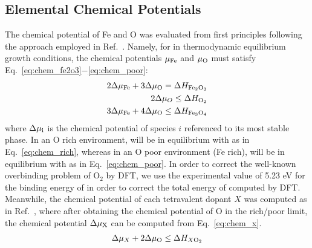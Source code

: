 \subsection{Elemental Chemical Potentials}
The chemical potential of Fe and O was evaluated from first principles following the approach employed in Ref.~\cite{lee2013thermodynamics}.
Namely, for  in thermodynamic equilibrium growth conditions, the chemical potentials $\mu_{\rm Fe}$ and $\mu_{\rm O}$ must satisfy Eq.~\ref{eq:chem_fe2o3}$-$\ref{eq:chem_poor}:
\begin{align}
    2\Delta \mu_{\rm Fe} + 3\Delta \mu_{\rm O} = \Delta H_{\ce{Fe2O3}} \label{eq:chem_fe2o3} \\
    2\Delta \mu_{O} \leq  \Delta H_{\ce{O2}} \label{eq:chem_rich} \\
    3\Delta \mu_{\rm Fe} + 4\Delta \mu_{\rm O} \leq \Delta H_{\ce{Fe3O4}} \label{eq:chem_poor}
\end{align}
where $\Delta \mu_{\rm i}$ is the chemical potential of species $i$ referenced to its most stable phase.
In an O rich environment,  will be in equilibrium with  as in Eq.~\ref{eq:chem_rich}, whereas in an O poor environment (Fe rich),  will be in equilibrium with  as in Eq.~\ref{eq:chem_poor}.
In order to correct the well-known overbinding problem of O$_2$ by DFT, we use the experimental value of 5.23 eV for the binding energy of  in order to correct the total energy of  computed by DFT. \cite{wang2006oxidation}
Meanwhile, the chemical potential of each tetravalent dopant $X$ was computed as in Ref.~\cite{zhou2015understanding}, where after obtaining the chemical potential of O in the rich/poor limit, the chemical potential $\Delta \mu_{\rm X}$ can be computed from Eq.~\ref{eq:chem_x}.
\begin{align}
    \Delta \mu_X + 2\Delta \mu_{\rm O} \leq \Delta H_{X{\rm O}_2} \label{eq:chem_x}
\end{align}


